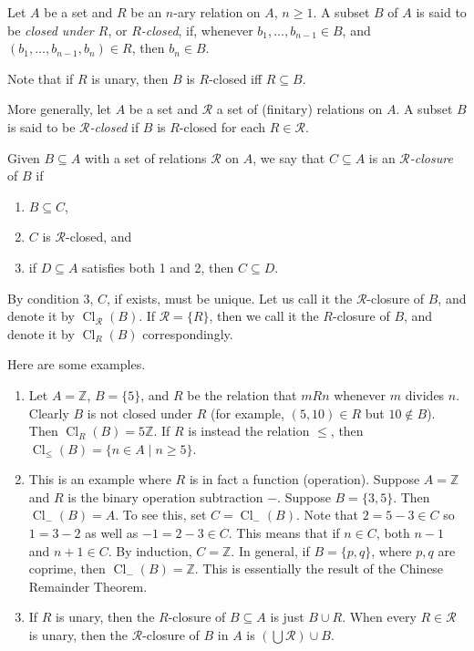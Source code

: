 \documentclass[12pt]{article}
\begin{document}
Let $A$ be a set and $R$ be an $n$-ary relation on $A$, $n\ge 1$.  A subset $B$ of $A$ is said to be \emph{closed under $R$}, or \emph{$R$-closed}, if, whenever $b_1,\ldots,b_{n-1}\in B$, and $(b_1,\ldots,b_{n-1},b_n)\in R$, then $b_n\in B$.  

Note that if $R$ is unary, then $B$ is $R$-closed iff $R\subseteq B$.

More generally, let $A$ be a set and $\mathcal{R}$ a set of (finitary) relations on $A$.  A subset $B$ is said to be \emph{$\mathcal{R}$-closed} if $B$ is $R$-closed for each $R\in\mathcal{R}$.

Given $B\subseteq A$ with a set of relations $\mathcal{R}$ on $A$, we say that $C\subseteq A$ is an \emph{$\mathcal{R}$-closure} of $B$ if 
\begin{enumerate}
\item $B\subseteq C$,
\item $C$ is $\mathcal{R}$-closed, and 
\item if $D\subseteq A$ satisfies both 1 and 2, then $C\subseteq D$.
\end{enumerate}

By condition 3, $C$, if exists, must be unique.  Let us call it the $\mathcal{R}$-closure of $B$, and denote it by $\operatorname{Cl}_{\mathcal{R}}(B)$.  If $\mathcal{R}=\lbrace R\rbrace$, then we call it the $R$-closure of $B$, and denote it by $\operatorname{Cl}_R(B)$ correspondingly.

Here are some examples.
\begin{enumerate}
\item Let $A=\mathbb{Z}$, $B=\lbrace 5\rbrace$, and $R$ be the relation that $mRn$ whenever $m$ divides $n$.  Clearly $B$ is not closed under $R$ (for example, $(5,10)\in R$ but $10\notin B$).  Then $\operatorname{Cl}_{R}(B) = 5\mathbb{Z}$.  If $R$ is instead the relation $\le$, then $\operatorname{Cl}_{\le}(B)=\lbrace n\in A\mid n\ge 5\rbrace$.
\item
This is an example where $R$ is in fact a function (operation).  Suppose $A=\mathbb{Z}$ and $R$ is the binary operation subtraction $-$.  Suppose $B=\lbrace 3,5\rbrace$.  Then $\operatorname{Cl}_{-}(B)=A$.  To see this, set $C=\operatorname{Cl}_{-}(B)$.  Note that $2=5-3\in C$ so $1=3-2$ as well as $-1=2-3\in C$.  This means that if $n\in C$, both $n-1$ and $n+1\in C$.  By induction, $C=\mathbb{Z}$.  In general, if $B=\lbrace p,q\rbrace$, where $p,q$ are coprime, then $\operatorname{Cl}_{-} (B) =\mathbb{Z}$.  This is essentially the result of the Chinese Remainder Theorem.
\item
If $R$ is unary, then the $R$-closure of $B\subseteq A$ is just $B\cup R$.  When every $R\in \mathcal{R}$ is unary, then the $\mathcal{R}$-closure of $B$ in $A$ is $(\bigcup \mathcal{R}) \cup B$.
\end{enumerate}
\end{document}
